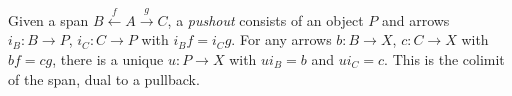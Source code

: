 
Given a span $B\xleftarrow{f}A\xrightarrow{g}C$, a \emph{pushout} consists of an object $P$ and arrows $i_B:B\to P$, $i_C:C\to P$ with $i_B f=i_Cg$. For any arrows $b:B\to X$, $c:C\to X$ with $bf=cg$, there is a unique $u:P\to X$ with $u i_B=b$ and $u i_C=c$. This is the colimit of the span, dual to a pullback.

